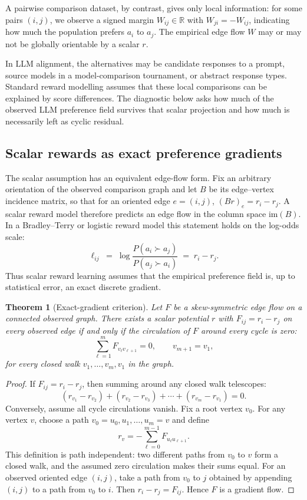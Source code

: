 \documentclass[10pt]{article}
\newtheorem{theorem}{Theorem}
\theoremstyle{definition}
\theoremstyle{remark}
\begin{document}
A pairwise comparison dataset, by contrast, gives only local information: for some pairs $(i, j)$, we observe a signed margin $W_{ij} \in \mathbb{R}$ with $W_{ji} = -W_{ij}$, indicating how much the population prefers $a_i$ to $a_j$. The empirical edge flow $W$ may or may not be globally orientable by a scalar $r$.

In LLM alignment, the alternatives may be candidate responses to a prompt, source models in a model-comparison tournament, or abstract response types. Standard reward modelling assumes that these local comparisons can be explained by score differences. The diagnostic below asks how much of the observed LLM preference field survives that scalar projection and how much is necessarily left as cyclic residual.

\subsection{Scalar rewards as exact preference gradients}

The scalar assumption has an equivalent edge-flow form. Fix an arbitrary orientation of the observed comparison graph and let $B$ be its edge--vertex incidence matrix, so that for an oriented edge $e=(i,j)$, $(Br)_e=r_i-r_j$. A scalar reward model therefore predicts an edge flow in the column space $\mathrm{im}(B)$. In a Bradley--Terry or logistic reward model this statement holds on the log-odds scale:
\begin{equation}
\ell_{ij}
\;=\;
\log\frac{P(a_i\succ a_j)}{P(a_j\succ a_i)}
\;=\;
r_i-r_j.
\label{eq:bt-logit}
\end{equation}
Thus scalar reward learning assumes that the empirical preference field is, up to statistical error, an exact discrete gradient.

\begin{theorem}[Exact-gradient criterion]\label{thm:exact-gradient}
Let $F$ be a skew-symmetric edge flow on a connected observed graph. There exists a scalar potential $r$ with $F_{ij}=r_i-r_j$ on every observed edge if and only if the circulation of $F$ around every cycle is zero:
\begin{equation}
\sum_{\ell=1}^{m} F_{v_\ell v_{\ell+1}} = 0,
\qquad v_{m+1}=v_1,
\end{equation}
for every closed walk $v_1,\ldots,v_m,v_1$ in the graph.
\end{theorem}
\begin{proof}
If $F_{ij}=r_i-r_j$, then summing around any closed walk telescopes:
\[
(r_{v_1}-r_{v_2})+(r_{v_2}-r_{v_3})+\cdots+(r_{v_m}-r_{v_1})=0.
\]
Conversely, assume all cycle circulations vanish. Fix a root vertex $v_0$. For any vertex $v$, choose a path $v_0=u_0,u_1,\ldots,u_m=v$ and define
\[
r_v=-\sum_{\ell=0}^{m-1} F_{u_\ell u_{\ell+1}} .
\]
This definition is path independent: two different paths from $v_0$ to $v$ form a closed walk, and the assumed zero circulation makes their sums equal. For an observed oriented edge $(i,j)$, take a path from $v_0$ to $j$ obtained by appending $(i,j)$ to a path from $v_0$ to $i$. Then $r_i-r_j=F_{ij}$. Hence $F$ is a gradient flow.
\end{proof}
\end{document}
